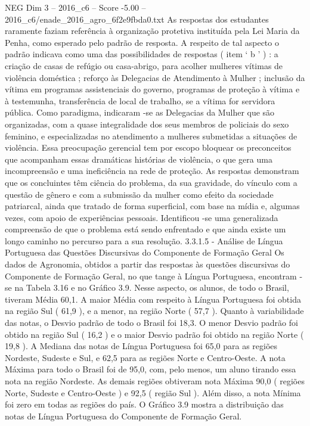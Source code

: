 \begin{textsample}{NEG Dim 3 – 2016\_c6 – Score -5.00 – 2016\_c6/enade\_2016\_agro\_6f2e9fbda0.txt}
As respostas dos estudantes raramente faziam referência à organização protetiva instituída pela Lei Maria da Penha, como esperado pelo padrão de resposta.
A respeito de tal aspecto o padrão indicava como uma das possibilidades de respostas ( item ‘ b ’ ) : a criação de casas de refúgio ou casa-abrigo, para acolher mulheres vítimas de violência doméstica ; reforço às Delegacias de Atendimento à Mulher ; inclusão da vítima em programas assistenciais do governo, programas de proteção à vítima e à testemunha, transferência de local de trabalho, se a vítima for servidora pública.
Como paradigma, indicaram -se as Delegacias da Mulher que são organizadas, com a quase integralidade dos seus membros de policiais do sexo feminino, e especializadas no atendimento a mulheres submetidas a situações de violência.
Essa preocupação gerencial tem por escopo bloquear os preconceitos que acompanham essas dramáticas histórias de violência, o que gera uma incompreensão e uma ineficiência na rede de proteção.
As respostas demonstram que os concluintes têm ciência do problema, da sua gravidade, do vínculo com a questão de gênero e com a submissão da mulher como efeito da sociedade patriarcal, ainda que tratado de forma superficial, com base na mídia e, algumas vezes, com apoio de experiências pessoais.
Identificou -se uma generalizada compreensão de que o problema está sendo enfrentado e que ainda existe um longo caminho no percurso para a sua resolução. 3.3.1.5 - Análise de Língua Portuguesa das Questões Discursivas do Componente de Formação Geral Os dados de Agronomia, obtidos a partir das respostas às questões discursivas do Componente de Formação Geral, no que tange à Língua Portuguesa, encontram -se na Tabela 3.16 e no Gráfico 3.9.
Nesse aspecto, os alunos, de todo o Brasil, tiveram Média 60,1.
A maior Média com respeito à Língua Portuguesa foi obtida na região Sul ( 61,9 ), e a menor, na região Norte ( 57,7 ).
Quanto à variabilidade das notas, o Desvio padrão de todo o Brasil foi 18,3.
O menor Desvio padrão foi obtido na região Sul ( 16,2 ) e o maior Desvio padrão foi obtido na região Norte ( 19,8 ).
A Mediana das notas de Língua Portuguesa foi 65,0 para as regiões Nordeste, Sudeste e Sul, e 62,5 para as regiões Norte e Centro-Oeste.
A nota Máxima para todo o Brasil foi de 95,0, com, pelo menos, um aluno tirando essa nota na região Nordeste.
As demais regiões obtiveram nota Máxima 90,0 ( regiões Norte, Sudeste e Centro-Oeste ) e 92,5 ( região Sul ).
Além disso, a nota Mínima foi zero em todas as regiões do país.
O Gráfico 3.9 mostra a distribuição das notas de Língua Portuguesa do Componente de Formação Geral.

\end{textsample}
